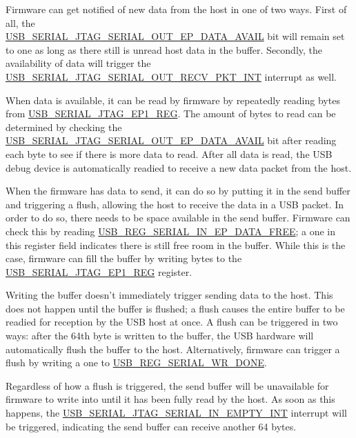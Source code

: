 \documentclass[main\_\_EN.tex]{subfiles}
\begin{document}
Firmware can get notified of new data from the host in one of two ways. First of all, the\\
\hyperref[fielddesc:USBSERIALJTAGSERIALOUTEPDATAAVAIL]{USB\_SERIAL\_JTAG\_SERIAL\_OUT\_EP\_DATA\_AVAIL}  bit  will remain set to one as long as there still is unread host data in the buffer. Secondly, the availability of data will trigger the  \hyperref[fielddesc:USBSERIALJTAGSERIALOUTRECVPKTINTRAW]{USB\_SERIAL\_JTAG\_SERIAL\_OUT\_RECV\_PKT\_INT} interrupt as well.

When data is available, it can be read by firmware by repeatedly reading bytes from \hyperref[fielddesc:USBSERIALJTAGRDWRBYTE]{USB\_SERIAL\_JTAG\_EP1\_REG}. The amount of bytes to read can be determined by checking the
\hyperref[fielddesc:USBSERIALJTAGSERIALOUTEPDATAAVAIL]{USB\_SERIAL\_JTAG\_SERIAL\_OUT\_EP\_DATA\_AVAIL} bit after reading each byte to see if there is more data to read. After all data is read, the USB debug device is automatically readied to receive a new data packet from the host. 

When the firmware has data to send, it can do so by putting it in the send buffer and triggering a flush, allowing the host to receive the data in a USB packet. In order to do so, there needs to be space available in the send buffer. Firmware can check this by reading  \hyperref[fielddesc:USBSERIALJTAGSERIALINEPDATAFREE]{USB\_REG\_SERIAL\_IN\_EP\_DATA\_FREE}; a one in this register field indicates there is still free room in the buffer. While this is the case, firmware can fill the buffer by writing bytes to the \hyperref[fielddesc:USBSERIALJTAGRDWRBYTE]{USB\_SERIAL\_JTAG\_EP1\_REG} register.

Writing the buffer doesn't immediately trigger sending data to the host. This does not happen until the buffer is flushed; a flush causes the entire buffer to be readied for reception by the USB host at once. A flush can be triggered in two ways: after the 64th byte is written to the buffer, the USB hardware will automatically flush the buffer to the host. Alternatively, firmware can trigger a flush by writing a one to \hyperref[fielddesc:USBSERIALJTAGWRDONE]{USB\_REG\_SERIAL\_WR\_DONE}. 

Regardless of how a flush is triggered, the send buffer will be unavailable for firmware to write into until it has been fully read by the host. As soon as this happens, the \hyperref[fielddesc:USBSERIALJTAGSERIALINEMPTYINTRAW]{USB\_SERIAL\_JTAG\_SERIAL\_IN\_EMPTY\_INT} interrupt will be triggered, indicating the send buffer can receive another 64 bytes.
\end{document}
